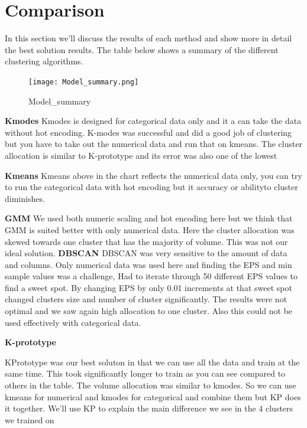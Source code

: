 \documentclass[conference]{IEEEtran}
\begin{document}
\section{Comparison}  
In this section we'll discuss the results of each method and show more in detail the best solution results.  The table below shows a summary of the different clustering algorithms.
\begin{figure}[!h]
	\texttt{[image: Model\_summary.png]}
	\caption{Model_summary }
	\label{fig: Model_summary}
\end{figure}

\textbf{Kmodes} \linebreak
Kmodes is designed for categorical data only and it a can take the data without hot encoding.  K-modes was successful and did a good job of clustering but you have to take out the numerical data and run that on kmeans.  The cluster allocation is similar to K-prototype and its error was also one of the lowest

\textbf{Kmeans} \linebreak
Kmeans above in the chart reflects the numerical data only,  you can try to run the categorical data with hot encoding but it accuracy or abilityto cluster diminishes.


\textbf{GMM} \linebreak
We used both numeric scaling and hot encoding here but we think that GMM is suited better with only numerical data.  Here the cluster allocation was skewed towards one cluster that has the majority of volume.  This was not our ideal solution.
\textbf{DBSCAN} \linebreak
DBSCAN was very sensitive to the amount of data and columns.  Only numerical data was used here and finding the EPS and min sample values was a challenge,  Had to iterate through 50 different EPS values to find a sweet spot.  By changing EPS by only 0.01 increments at that sweet spot changed clusters size and number of cluster significantly.  The results were not optimal and we saw again high allocation to one cluster.  Also this could not be used effectively with categorical data.

\textbf{K-prototype} \linebreak

KPrototype was our best soluton in that we can use all the data and train at the same time.  This took significantly longer to train as you can see compared to others in the table.  The volume allocation was similar to kmodes.  So we can use kmeans for numerical and kmodes for categorical and combine them but KP does it together.  We'll use KP to explain the main difference we see in the 4 clusters we trained on
\end{document}
